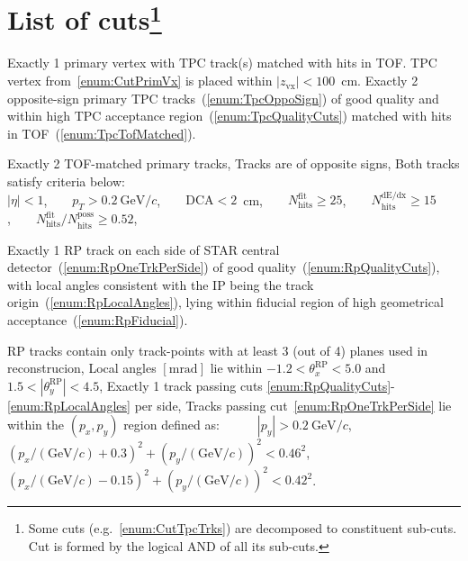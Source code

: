 \section[List of cuts]{List of cuts\footnote{Some cuts (e.g.~\ref{enum:CutTpcTrks}) are decomposed to constituent sub-cuts. Cut is formed by the logical AND of all its sub-cuts.}}\label{sec:listOfCuts}
\begin{enumerate}[label=C\arabic*]
 \itemm Exactly 1 primary vertex with TPC track(s) matched with hits in TOF.\label{enum:CutPrimVx}
 \itemm TPC vertex from~\ref{enum:CutPrimVx} is placed within $|z_{\textrm{vx}}|<100$~cm.\label{enum:CutZVx}
 \itemm Exactly 2 opposite-sign primary TPC tracks~(\ref{enum:TpcOppoSign}) of good quality and within high TPC acceptance region~(\ref{enum:TpcQualityCuts}) matched with hits in TOF~(\ref{enum:TpcTofMatched}).\label{enum:CutTpcTrks}
    \begin{enumerate}[label=\theenumi.\arabic*]
      \itemm Exactly 2 TOF-matched primary tracks,\label{enum:TpcTofMatched}
      \itemm Tracks are of opposite signs,\label{enum:TpcOppoSign}
      \itemm Both tracks satisfy criteria below:\label{enum:TpcQualityCuts}\\
      $|\eta|<1$,~~~~$p_{T}>0.2~\textrm{GeV}/c$,~~~~$\textrm{DCA}<2$~cm,~~~~$N_{\textrm{hits}}^{\textrm{fit}}\geq25$,~~~~$N_{\textrm{hits}}^{\textrm{dE/dx}}\geq15$,~~~~$N_{\textrm{hits}}^{\textrm{fit}}/N_{\textrm{hits}}^{\textrm{poss}}\geq0.52$,
    \end{enumerate}
 \itemm Exactly 1 RP track on each side of STAR central detector~(\ref{enum:RpOneTrkPerSide}) of good quality~(\ref{enum:RpQualityCuts}), with local angles consistent with the IP being the track origin~(\ref{enum:RpLocalAngles}), lying within fiducial region of high geometrical acceptance~(\ref{enum:RpFiducial}).\label{enum:CutRpTrks}
      \begin{enumerate}[label=\theenumi.\arabic*]
      \itemm RP tracks contain only track-points with at least 3 (out of 4) planes used in reconstrucion,\label{enum:RpQualityCuts}
      \itemm Local angles $[\textrm{mrad}]$ lie within $-1.2<\theta_{x}^{\textrm{RP}}<5.0$ and $1.5<|\theta_{y}^{\textrm{RP}}|<4.5$,\label{enum:RpLocalAngles}
      \itemm Exactly 1 track passing cuts \ref{enum:RpQualityCuts}-\ref{enum:RpLocalAngles} per side,\label{enum:RpOneTrkPerSide}
      \itemm Tracks passing cut~\ref{enum:RpOneTrkPerSide} lie within the $(p_{x},p_{y})$ region defined as\label{enum:RpFiducial}:~~~~~~$|p_{y}|>0.2~\textrm{GeV}/c$,\\[4pt]
      $(p_{x}/(\textrm{GeV}/c)+0.3)^{2}+(p_{y}/(\textrm{GeV}/c))^{2}<0.46^{2}$,~~~~~~~$(p_{x}/(\textrm{GeV}/c)-0.15)^{2}+(p_{y}/(\textrm{GeV}/c))^{2}<0.42^{2}$.

\end{enumerate}
\end{enumerate}
